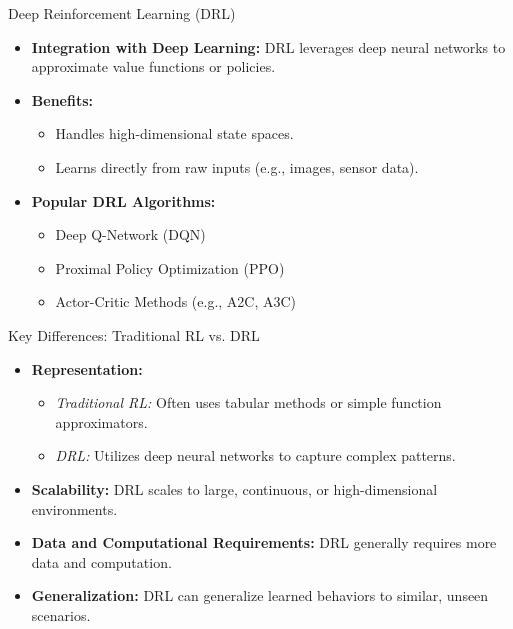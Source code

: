 \documentclass{beamer}
\begin{document}
\begin{frame}{Deep Reinforcement Learning (DRL)}
   \begin{itemize}[<+->]
       \item \textbf{Integration with Deep Learning:} DRL leverages deep neural networks to approximate value functions or policies.
       \item \textbf{Benefits:}
         \begin{itemize}[<+->]
             \item Handles high-dimensional state spaces.
             \item Learns directly from raw inputs (e.g., images, sensor data).
         \end{itemize}
       \item \textbf{Popular DRL Algorithms:}
         \begin{itemize}[<+->]
             \item Deep Q-Network (DQN)
             \item Proximal Policy Optimization (PPO)
             \item Actor-Critic Methods (e.g., A2C, A3C)
         \end{itemize}
   \end{itemize}
\end{frame}

\begin{frame}{Key Differences: Traditional RL vs. DRL}
   \begin{itemize}[<+->]
       \item \textbf{Representation:} 
         \begin{itemize}[<+->]
             \item \emph{Traditional RL:} Often uses tabular methods or simple function approximators.
             \item \emph{DRL:} Utilizes deep neural networks to capture complex patterns.
         \end{itemize}
       \item \textbf{Scalability:} DRL scales to large, continuous, or high-dimensional environments.
       \item \textbf{Data and Computational Requirements:} DRL generally requires more data and computation.
       \item \textbf{Generalization:} DRL can generalize learned behaviors to similar, unseen scenarios.
   \end{itemize}
\end{frame}
\end{document}
